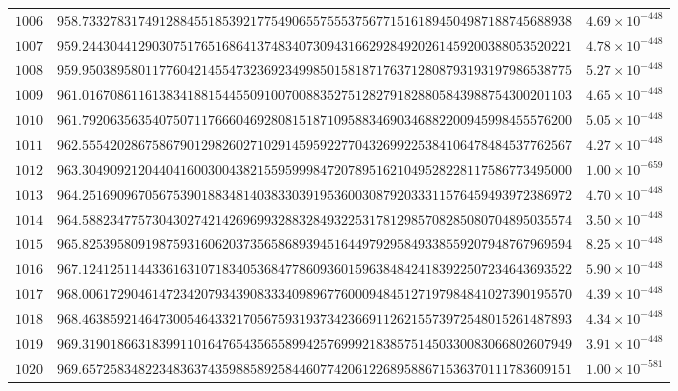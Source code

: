 \documentclass[12pt,reqno]{amsart}
\theoremstyle{remark}
\begin{document}
\begin{longtable}{clc}
$1006$ & $958.7332783174912884551853921775490655755537567715161894504987188745688938$ & $4.69\times 10^{-448}$ \\
$1007$ & $959.2443044129030751765168641374834073094316629284920261459200388053520221$ & $4.78\times 10^{-448}$ \\
$1008$ & $959.9503895801177604214554732369234998501581871763712808793193197986538775$ & $5.27\times 10^{-448}$ \\
$1009$ & $961.0167086116138341881544550910070088352751282791828805843988754300201103$ & $4.65\times 10^{-448}$ \\
$1010$ & $961.7920635635407507117666046928081518710958834690346882200945998455576200$ & $5.05\times 10^{-448}$ \\
$1011$ & $962.5554202867586790129826027102914595922770432699225384106478484537762567$ & $4.27\times 10^{-448}$ \\
$1012$ & $963.3049092120440416003004382155959998472078951621049528228117586773495000$ & $1.00\times 10^{-659}$ \\
$1013$ & $964.2516909670567539018834814038330391953600308792033311576459493972386972$ & $4.70\times 10^{-448}$ \\
$1014$ & $964.5882347757304302742142696993288328493225317812985708285080704895035574$ & $3.50\times 10^{-448}$ \\
$1015$ & $965.8253958091987593160620373565868939451644979295849338559207948767969594$ & $8.25\times 10^{-448}$ \\
$1016$ & $967.1241251144336163107183405368477860936015963848424183922507234643693522$ & $5.90\times 10^{-448}$ \\
$1017$ & $968.0061729046147234207934390833340989677600094845127197984841027390195570$ & $4.39\times 10^{-448}$ \\
$1018$ & $968.4638592146473005464332170567593193734236691126215573972548015261487893$ & $4.34\times 10^{-448}$ \\
$1019$ & $969.3190186631839911016476543565589942576999218385751450330083066802607949$ & $3.91\times 10^{-448}$ \\
$1020$ & $969.6572583482234836374359885892584460774206122689588671536370111783609151$ & $1.00\times 10^{-581}$ \\
\end{longtable}
\normalsize
\setlength{\LTleft}{0pt}
\setlength{\LTright}{0pt}
\end{document}
